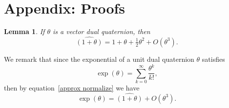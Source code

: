 \documentclass[reqno,12pt]{amsart}
\newtheorem{Lemma}{Lemma}
\begin{document}
\section{Appendix: Proofs}
\label{sec proofs}

\begin{Lemma} 
\label{lemma approx normalize}
If $\theta$ is a vector dual quaternion, then
\begin{equation}
\label{approx normalize}
\widehat {(1+\theta)} = 1 + \theta + \tfrac12 \theta^2 + O(\theta^3).
\end{equation}
\end{Lemma}

We remark that since the exponential of a unit dual quaternion $\theta$ \cite{wang-et-al} satisfies
\begin{equation}
\label{exponential}
\exp(\theta) = \sum_{k=0}^\infty \frac{\theta^k}{k!},
\end{equation}
then by equation~\eqref{approx normalize} we have
\begin{equation}
\label{exp-normal}
\exp(\theta) = \widehat{(1+\theta)} + O(\theta^3) .
\end{equation}
\end{document}
